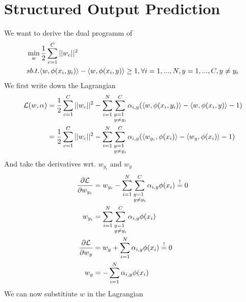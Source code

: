 
\section*{Structured Output Prediction} 
We want to derive the dual programm of
\begin{align}
	&\min_w \frac{1}{2} \sum_{c=1}^C ||w_c||^2\\
	&sb.t. \langle w, \phi(x_i,y_i)\rangle - \langle w, \phi(x_i,y)\rangle \geq 1 , \forall i=1,...,N, y=1,...,C,y \neq y_i \notag
\end{align}
We first write down the Lagrangian
\begin{align}
	\mathcal{L}(w,\alpha) &=
	\frac{1}{2} \sum_{c=1}^C ||w_c||^2 - 
	\sum_{i=1}^N \sum_{\begin{subarray}{l} y=1 \\ y\neq y_i \end{subarray}}^C
	\alpha_{i,y}(\langle w, \phi(x_i,y_i)\rangle - \langle w, \phi(x_i,y)\rangle - 1 ) \\
	&= \frac{1}{2} \sum_{c=1}^C ||w_c||^2 - \sum_{i=1}^N \sum_{\begin{subarray}{l} y=1 \\ y\neq y_i \end{subarray}}^C \alpha_{i,y}(\langle w_{y_i}, \phi(x_i)\rangle - \langle w_y, \phi(x_i)\rangle - 1 ) \\
\end{align}
And take the derivatives wrt. $w_{y_i}$ and $w_y$
\begin{align}
	\frac{\partial \mathcal{L}}{\partial w_{y_i}} &= w_{y_i} - 
	\sum_{i=1}^N \sum_{\begin{subarray}{l} y=1 \\ y\neq y_i \end{subarray}}^C
	\alpha_{i,y} \phi(x_i) \stackrel{!}{=} 0 \\
	w_{y_i} &= \sum_{i=1}^N \sum_{\begin{subarray}{l} y=1 \\ y\neq y_i \end{subarray}}^C
	\alpha_{i,y} \phi(x_i) \\
	\frac{\partial \mathcal{L}}{\partial w_{y}} &= w_{y} + 
	\sum_{i=1}^N 
	\alpha_{i,y} \phi(x_i) \stackrel{!}{=} 0 \\
	w_{y} &= - \sum_{i=1}^N \alpha_{i,y} \phi(x_i)
\end{align}
We can now substitiute $w$ in the Lagrangian
